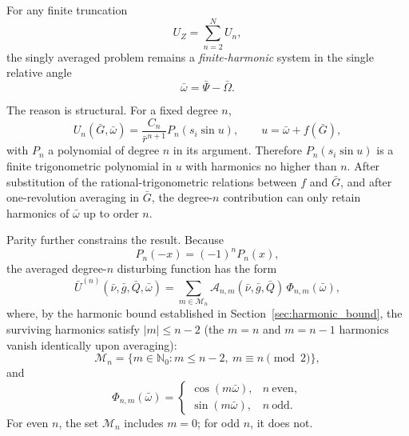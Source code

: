 \documentclass[11pt]{article}
\begin{document}
For any finite truncation
\begin{equation}
U_Z = \sum_{n=2}^{N} U_n,
\end{equation}
the singly averaged problem remains a \emph{finite-harmonic} system in the
single relative angle
\begin{equation}
\bar\omega = \bar\Psi - \bar\Omega.
\end{equation}

The reason is structural. For a fixed degree $n$,
\begin{equation}
U_n(\bar G,\bar\omega)
=
\frac{C_n}{\bar r^{n+1}} P_n\!\left(s_i \sin u\right),
\qquad
u = \bar\omega + f(\bar G),
\end{equation}
with $P_n$ a polynomial of degree $n$ in its argument. Therefore
$P_n(s_i\sin u)$ is a finite trigonometric polynomial in $u$ with harmonics no
higher than $n$. After substitution of the rational-trigonometric relations
between $f$ and $\bar G$, and after one-revolution averaging in $\bar G$, the
degree-$n$ contribution can only retain harmonics of $\bar\omega$ up to order
$n$.

Parity further constrains the result. Because
\begin{equation}
P_n(-x) = (-1)^n P_n(x),
\end{equation}
the averaged degree-$n$ disturbing function has the form
\begin{equation}
\bar U^{(n)}(\bar\nu,\bar g,\bar Q,\bar\omega)
=
\sum_{m\in\mathcal M_n}
\mathcal A_{n,m}(\bar\nu,\bar g,\bar Q)\,\Phi_{n,m}(\bar\omega),
\label{eq:Un_fourier}
\end{equation}
where, by the harmonic bound established in
Section~\ref{sec:harmonic_bound}, the surviving harmonics satisfy
$|m| \le n-2$ (the $m = n$ and $m = n-1$ harmonics vanish identically
upon averaging):
\begin{equation}
\mathcal M_n = \{m \in \mathbb N_0: m \le n-2,\ m \equiv n \pmod 2\},
\end{equation}
and
\begin{equation}
\Phi_{n,m}(\bar\omega)
=
\begin{cases}
\cos(m\bar\omega), & n \ \text{even}, \\
\sin(m\bar\omega), & n \ \text{odd}.
\end{cases}
\label{eq:Phi_parity}
\end{equation}
For even $n$, the set $\mathcal M_n$ includes $m=0$; for odd $n$, it does not.
\end{document}
